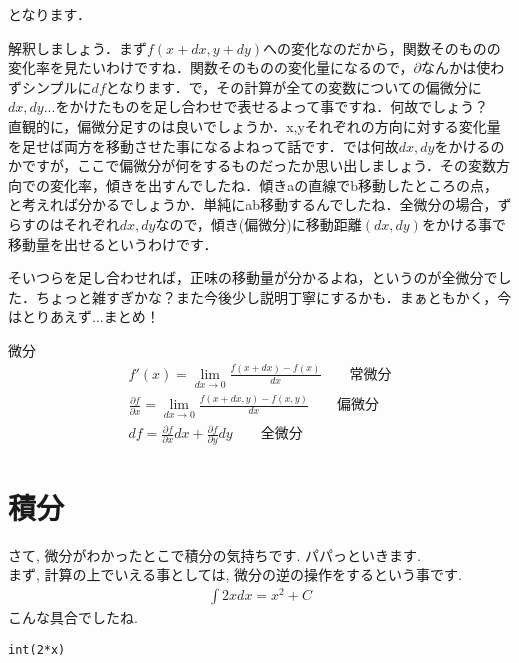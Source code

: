 \documentclass[11pt,a4paper]{ujreport}
\begin{document}
となります．

解釈しましょう．まず$f(x+dx, y+dy)$への変化なのだから，関数そのものの変化率を見たいわけですね．関数そのものの変化量になるので，$\partial$なんかは使わずシンプルに$df$となります．で，その計算が全ての変数についての偏微分に$dx, dy...$をかけたものを足し合わせで表せるよって事ですね．何故でしょう？\\


直観的に，偏微分足すのは良いでしょうか．x,yそれぞれの方向に対する変化量を足せば両方を移動させた事になるよねって話です．では何故$dx, dy$をかけるのかですが，ここで偏微分が何をするものだったか思い出しましょう．その変数方向での変化率，傾きを出すんでしたね．傾きaの直線でb移動したところの点，と考えれば分かるでしょうか．単純にab移動するんでしたね．全微分の場合，ずらすのはそれぞれ$dx, dy$なので，傾き(偏微分)に移動距離$(dx,dy)$をかける事で移動量を出せるというわけです．

そいつらを足し合わせれば，正味の移動量が分かるよね，というのが全微分でした．ちょっと雑すぎかな？また今後少し説明丁寧にするかも．まぁともかく，今はとりあえず...まとめ！\\

\begin{screen}
微分
\begin{eqnarray}
f'(x) =\lim_{dx \rightarrow 0} \frac{f(x+dx) - f(x)}{dx} \qquad \text{常微分} \nonumber \\
\frac{\partial f}{\partial x} = \lim_{dx \rightarrow 0} \frac{f(x+dx, y) - f(x, y)}{dx} \qquad \text{偏微分}\nonumber \\
df = \frac{\partial f}{\partial x}dx + \frac{\partial f}{\partial y}dy \qquad \text{全微分} \nonumber
\end{eqnarray}
\end{screen}



\section{積分}
さて, 微分がわかったとこで積分の気持ちです. パパっといきます.\\
まず, 計算の上でいえる事としては, 微分の逆の操作をするという事です.
\begin{eqnarray}
\label{eq:int}
\int 2x dx= x^2 + C
\end{eqnarray}
こんな具合でしたね. \\


\begin{lstlisting}[caption=\ref{eq:int}のコード,label=sc:int]
int(2*x)
\end{lstlisting}
\end{document}
